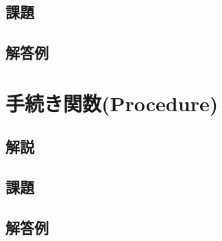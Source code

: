 \documentclass[10pt,a4j]{jbook}
\begin{document}
\subsection{課題}
 
\subsection{解答例}
 

\pagebreak
\section{手続き関数(Procedure)}
\subsection{解説}
 
\subsection{課題}
 
\subsection{解答例}
 
\end{document}
